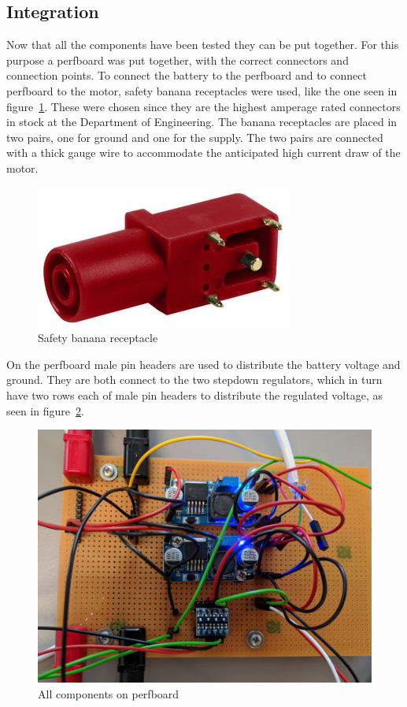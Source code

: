 \subsection{Integration}
\label{sec:hardware_int}
Now that all the components have been tested they can be put together. For this purpose a perfboard\cite{perfboard} was put together, with the correct connectors and connection points.
To connect the battery to the perfboard and to connect perfboard to the motor, safety banana receptacles\cite{banana-connector} were used, like the one seen in figure~\ref{fig:banana_connector}. These were chosen since they are the highest amperage rated connectors in stock at the Department of Engineering. The banana receptacles are placed in two pairs, one for ground and one for the supply. The two pairs are connected with a thick gauge wire to accommodate the anticipated high current draw of the motor. 

\begin{figure}[h]
\centering
\includegraphics[width=0.3\linewidth]{Images/Design/safety-banana-receptical}
\caption{Safety banana receptacle\cite{banana-connector}}
\label{fig:banana_connector}
\end{figure}


On the perfboard male pin headers are used to distribute the battery voltage and ground. They are both connect to the two stepdown regulators, which in turn have two rows each of male pin headers to distribute the regulated voltage, as seen in figure~\ref{fig:integration}. 

\begin{figure}[h]
\centering
\includegraphics[width=0.7\linewidth]{Images/Implementation/integration}
\caption{All components on perfboard}
\label{fig:integration}
\end{figure}

